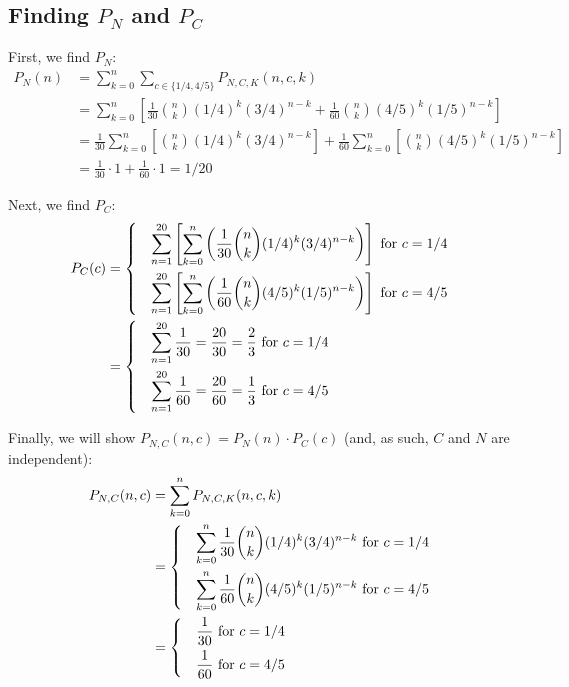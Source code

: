 \documentclass[paper=a4, fontsize=11pt]{scrartcl} %
\numberwithin{equation}{section} %
\numberwithin{figure}{section} %
\numberwithin{table}{section} %
\begin{document}
\subsection{Finding $P_N$ and $P_C$}

First, we find $P_N$:
\begin{align*}
P_N(n) &= \sum_{k = 0}^n \sum_{c \in \{1/4, 4/5\}} P_{N, C, K}(n,c,k)\\
   &= \sum_{k = 0}^n \left[\frac{1}{30}{n \choose k}(1/4)^{k}(3/4)^{n-k} + \frac{1}{60}{n \choose k}(4/5)^{k}(1/5)^{n-k} \right] \\
   &= \frac{1}{30}\sum_{k = 0}^n \left[{n \choose k}(1/4)^{k}(3/4)^{n-k} \right] + \frac{1}{60} \sum_{k = 0}^n \left[{n \choose k}(4/5)^{k}(1/5)^{n-k} \right] \\
   &= \frac{1}{30} \cdot 1 + \frac{1}{60} \cdot 1= 1/20
\end{align*}

Next, we find $P_C$:
\begin{align*}
P_C(c) &=
\begin{dcases}
& \sum_{n = 1}^{20} \left[ \sum_{k = 0}^{n} \left(\frac{1}{30}{n \choose k}(1/4)^{k}(3/4)^{n-k} \right) \right] \textrm{  for } c = 1/4 \\
& \sum_{n = 1}^{20} \left[ \sum_{k = 0}^{n} \left(\frac{1}{60}{n \choose k}(4/5)^{k}(1/5)^{n-k} \right) \right] \textrm{  for } c = 4/5 \\
\end{dcases}\\
&=
\begin{dcases}
& \sum_{n = 1}^{20} \frac{1}{30} =  \frac{20}{30} = \frac{2}{3}  \textrm{  for } c = 1/4 \\
& \sum_{n = 1}^{20}  \frac{1}{60} =\frac{20}{60} = \frac{1}{3}  \textrm{  for } c = 4/5 \\
\end{dcases}
\end{align*}

Finally, we will show $P_{N,C}(n,c) = P_N(n) \cdot P_C(c)$ (and, as such, $C$ and $N$ are independent):
\begin{align*}
P_{N,C}(n,c) &= \sum_{k = 0}^n P_{N, C, K} (n, c, k) \\
   &=
   \begin{dcases}
   & \sum_{k = 0}^{n} \frac{1}{30}{n \choose k}(1/4)^{k}(3/4)^{n-k} \textrm{  for } c = 1/4 \\
   & \sum_{k = 0}^{n} \frac{1}{60}{n \choose k}(4/5)^{k}(1/5)^{n-k} \textrm{  for } c = 4/5 \\
   \end{dcases}\\
   &=
   \begin{dcases}
   & \frac{1}{30} \textrm{  for } c = 1/4 \\
   & \frac{1}{60} \textrm{  for } c = 4/5
   \end{dcases}
\end{align*}
\end{document}
